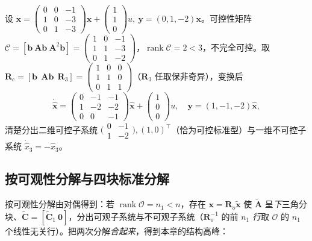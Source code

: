 \begin{example}[按可控性分解]\label{ex:co-decomp-c}
设 $\dot{\mathbf{x}}=\begin{pmatrix}0&0&-1\\1&0&-3\\0&1&-3\end{pmatrix}\mathbf{x}+\begin{pmatrix}1\\1\\0\end{pmatrix}u,\ \mathbf{y}=(0,1,-2)\mathbf{x}$。可控性矩阵 $\mathcal{C}=[\mathbf{b}\ \mathbf{A}\mathbf{b}\ \mathbf{A}^2\mathbf{b}]=\begin{pmatrix}1&0&-1\\1&1&-3\\0&1&-2\end{pmatrix}$，$\operatorname{rank}\mathcal{C}=2<3$，不完全可控。取 $\mathbf{R}_c=[\mathbf{b}\ \ \mathbf{A}\mathbf{b}\ \ \mathbf{R}_3]=\begin{pmatrix}1&0&0\\1&1&0\\0&1&1\end{pmatrix}$（$\mathbf{R}_3$ 任取保非奇异），变换后
\[
  \dot{\hat{\mathbf{x}}}=\begin{pmatrix}0&-1&-1\\1&-2&-2\\0&0&-1\end{pmatrix}\hat{\mathbf{x}}+\begin{pmatrix}1\\0\\0\end{pmatrix}u,\quad
  \mathbf{y}=(1,-1,-2)\hat{\mathbf{x}},
\]
清楚分出二维可控子系统 $\big(\begin{smallmatrix}0&-1\\1&-2\end{smallmatrix}\big),(1,0)^\top$（恰为可控标准型）与一维不可控子系统 $\dot{\hat{x}}_3=-\hat{x}_3$\cite{liubao2006modern}。
\end{example}

\subsection{按可观性分解与四块标准分解}
\label{sec:co-decomp-co}

按可观性分解由对偶得到：若 $\operatorname{rank}\mathcal{O}=n_1<n$，存在 $\mathbf{x}=\mathbf{R}_o\tilde{\mathbf{x}}$ 使 $\tilde{\mathbf{A}}$ 呈\emph{下}三角分块、$\tilde{\mathbf{C}}=[\tilde{\mathbf{C}}_1\ \mathbf{0}]$，分出可观子系统与不可观子系统（$\mathbf{R}_o^{-1}$ 的前 $n_1$ \emph{行}取 $\mathcal{O}$ 的 $n_1$ 个线性无关行）\cite{liubao2006modern}。把两次分解\emph{合起来}，得到本章的结构高峰：

